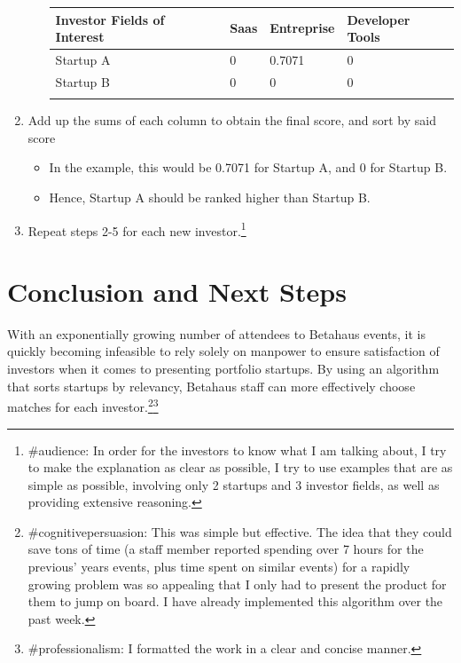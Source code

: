 \documentclass{article}
\begin{document}
\begin{enumerate}
\begin{itemize}
\begin{tabular}{llll}
\hline
\multicolumn{1}{|l|}{Investor Fields of Interest} & \multicolumn{1}{l|}{Saas} & \multicolumn{1}{l|}{Entreprise} & \multicolumn{1}{l|}{Developer Tools} \\ \hline
\multicolumn{1}{|l|}{Startup A}                   & \multicolumn{1}{l|}{0}    & \multicolumn{1}{l|}{0.7071}     & \multicolumn{1}{l|}{0}               \\ \hline
\multicolumn{1}{|l|}{Startup B}                   & \multicolumn{1}{l|}{0}    & \multicolumn{1}{l|}{0}          & \multicolumn{1}{l|}{0}               \\ \hline
                                                  &                           &                                 &                                     
\end{tabular}
 \end{itemize}
\item Add up the sums of each column to obtain the final score, and sort by said score \begin{itemize}
\itemsep-0.3em \item In the example, this would be 0.7071 for Startup A, and 0 for Startup B.
\item Hence, Startup A should be ranked higher than Startup B. 
\end{itemize}


\item Repeat steps 2-5 for each new investor.\footnote{\#audience: In order for the investors to know what I am talking about, I try to make the explanation as clear as possible, I try to use examples that are as simple as possible, involving only 2 startups and 3 investor fields, as well as providing extensive reasoning.}
\end{enumerate}


\section*{Conclusion and Next Steps}
With an exponentially growing number of attendees to Betahaus events, it is quickly becoming infeasible to rely solely on manpower to ensure satisfaction of investors when it comes to presenting portfolio startups. By using an algorithm that sorts startups by relevancy, Betahaus staff can more effectively choose matches for each investor.\footnote{\#cognitivepersuasion: This was simple but effective. The idea that they could save tons of time (a staff member reported spending over 7 hours for the previous' years events, plus time spent on similar events) for a rapidly growing problem was so appealing that I only had to present the product for them to jump on board. I have already implemented this algorithm over the past week.}\footnote{\#professionalism: I formatted the work in a clear and concise manner.}
\end{document}
